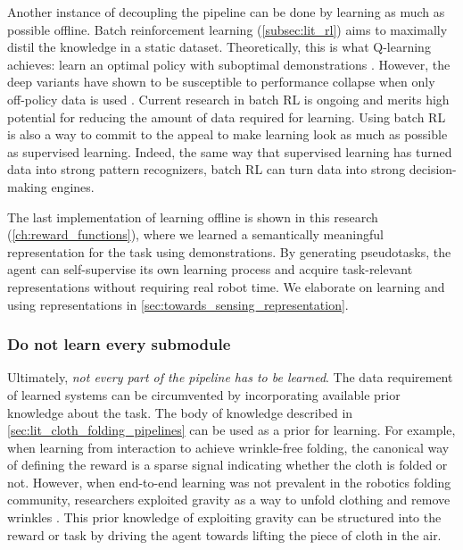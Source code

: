 \documentclass[\home/main.tex]{subfiles}
\begin{document}
Another instance of decoupling the pipeline can be done by learning as much as possible offline. Batch reinforcement learning (\cref{subsec:lit_rl}) aims to maximally distil the knowledge in a static dataset. Theoretically, this is what Q-learning achieves: learn an optimal policy with suboptimal demonstrations \autocite{Sutton2018}. However, the deep variants have shown to be susceptible to performance collapse when only off-policy data is used \autocite{hausknecht2016policy}. Current research in batch RL is ongoing and merits high potential for reducing the amount of data required for learning. Using batch RL is also a way to commit to the appeal to make learning look as much as possible as supervised learning. Indeed, the same way that supervised learning has turned data into strong pattern recognizers, batch RL can turn data into strong decision-making engines.

The last implementation of learning offline is shown in this research (\cref{ch:reward_functions}), where we learned a semantically meaningful representation for the task using demonstrations. By generating pseudotasks, the agent can self-supervise its own learning process and acquire task-relevant representations without requiring real robot time. We elaborate on learning and using representations in \cref{sec:towards_sensing_representation}.

\subsubsection{Do not learn every submodule}
Ultimately, \emph{not every part of the pipeline has to be learned}.
The data requirement of learned systems can be circumvented by incorporating available prior knowledge about the task. The body of knowledge described in \cref{sec:lit_cloth_folding_pipelines} can be used as a prior for learning. For example, when learning from interaction to achieve wrinkle-free folding, the canonical way of defining the reward is a sparse signal indicating whether the cloth is folded or not. However, when end-to-end learning was not prevalent in the robotics folding community, researchers exploited gravity as a way to unfold clothing and remove wrinkles \autocite{Doumanoglou2016,Maitin2010}. This prior knowledge of exploiting gravity can be structured into the reward or task by driving the agent towards lifting the piece of cloth in the air.
\end{document}
